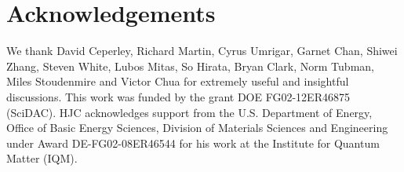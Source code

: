 
\section{Acknowledgements} 
We thank  David Ceperley,  Richard Martin, Cyrus Umrigar,  Garnet Chan,  Shiwei Zhang, Steven White,  
Lubos Mitas, So Hirata, Bryan Clark, Norm Tubman, Miles Stoudenmire and Victor Chua for extremely useful and insightful discussions. 
This work was funded by the grant DOE FG02-12ER46875 (SciDAC). HJC acknowledges support from the U.S. Department of Energy, 
Office of Basic Energy Sciences, Division of Materials Sciences and Engineering under Award DE-FG02-08ER46544 for his work at the Institute for Quantum Matter (IQM). 

